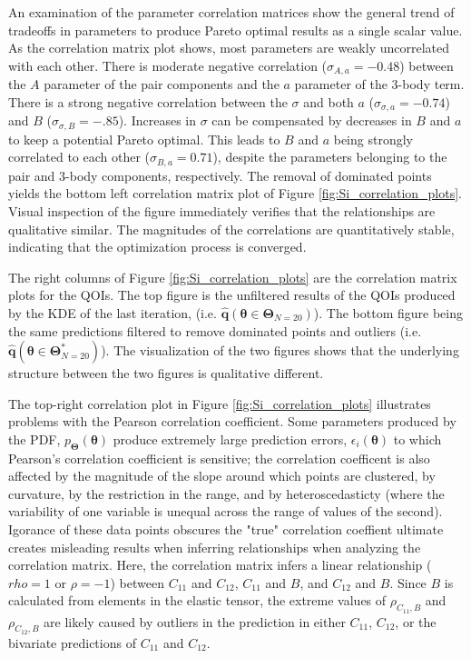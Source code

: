 An examination of the parameter correlation matrices show the general trend of tradeoffs in parameters to produce Pareto optimal results as a single scalar value.  As the correlation matrix plot shows, most parameters are weakly uncorrelated with each other.
There is moderate negative correlation ($\sigma_{A,a}=-0.48$) between the $A$ parameter of the pair components and the $a$ parameter of the 3-body term.
There is a strong negative correlation between the $\sigma$ and both $a$ ($\sigma_{\sigma,a}=-0.74$) and $B$ ($\sigma_{\sigma,B}=-.85$).  Increases in $\sigma$ can be compensated by decreases in $B$ and $a$ to keep a potential Pareto optimal.
This leads to $B$ and $a$ being strongly correlated to each other ($\sigma_{B,a}=0.71$), despite the parameters belonging to the pair and 3-body components, respectively.
The removal of dominated points yields the bottom left correlation matrix plot of Figure \ref{fig:Si_correlation_plots}.
Visual inspection of the figure immediately verifies that the relationships are qualitative similar.
The magnitudes of the correlations are quantitatively stable, indicating that the optimization process is converged.

The right columns of Figure \ref{fig:Si_correlation_plots} are the correlation matrix plots for the QOIs.
The top figure is the unfiltered results of the QOIs produced by the KDE of the last iteration, (i.e. $\hat{\bm{q}}(\bm{\theta} \in \bm{\Theta}_{N=20})$).
The bottom figure being the same predictions filtered to remove dominated points and outliers (i.e. $\hat{\bm{q}}(\bm{\theta} \in \bm{\Theta}_{N=20}^*)$).
The visualization of the two figures shows that the underlying structure between the two figures is qualitative different.

The top-right correlation plot in Figure \ref{fig:Si_correlation_plots} illustrates problems with the Pearson correlation coefficient.
Some parameters produced by the PDF, $p_{\bm{\Theta}}(\bm{\theta})$ produce extremely large prediction errors, $\epsilon_i(\bm{\theta})$ to which Pearson’s correlation coefficient is sensitive; the correlation coefficent is also affected by the magnitude of the slope around which points are clustered, by curvature, by the restriction in the range, and by heteroscedasticty (where the variability of one variable is unequal across the range of values of the second).\cite{wilcox2011_estimation_1,wilcox2011_estimation_2}
Igorance of these data points obscures the "true" correlation coeffient ultimate creates misleading results when inferring relationships when analyzing the correlation matrix.  Here, the correlation matrix infers a linear relationship ($rho=1$ or $\rho=-1$) between $C_{11}$ and $C_{12}$, $C_{11}$ and $B$, and $C_{12}$ and $B$.
Since $B$ is calculated from elements in the elastic tensor, the extreme values of $\rho_{C_{11},B}$ and $\rho_{C_{12},B}$ are likely caused by outliers in the prediction in either $C_{11}$, $C_{12}$, or the bivariate predictions of $C_{11}$ and $C_{12}$.


